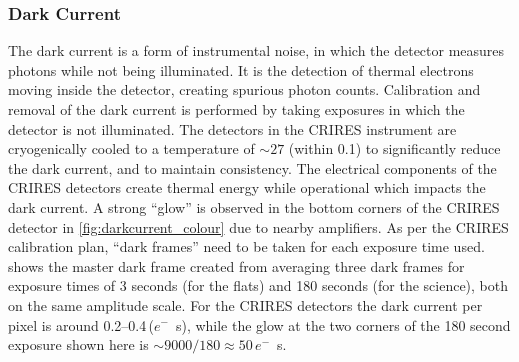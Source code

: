 \subsubsection{Dark Current}
\label{subsubsec:darkcurrent}
The dark current is a form of instrumental noise, in which the detector measures photons while not being illuminated.
It is the detection of thermal electrons moving inside the detector, creating spurious photon counts.
Calibration and removal of the dark current is performed by taking exposures in which the detector is not illuminated.
The detectors in the {CRIRES} instrument are cryogenically cooled to a temperature of \(\sim27\)\K{} (within 0.1\K{}) to significantly reduce the dark current, and to maintain consistency.
The electrical components of the {CRIRES} detectors create thermal energy while operational which impacts the dark current.
A strong ``glow'' is observed in the bottom corners of the {CRIRES} detector in \cref{fig:darkcurrent_colour} due to nearby amplifiers.
As per the {CRIRES} calibration plan, ``dark frames'' need to be taken for each exposure time used.
 shows the master dark frame created from averaging three dark frames for exposure times of 3 seconds (for the flats) and 180 seconds (for the science), both on the same amplitude scale.
For the {CRIRES} detectors the dark current per pixel is around 0.2--0.4\,(\(e^{-}\)\si{\per\second}), while the glow at the two corners of the 180 second exposure shown here is \(\sim9000 / 180\approx50\)\,\(e^{-}\)\si{\per\second}.

%


